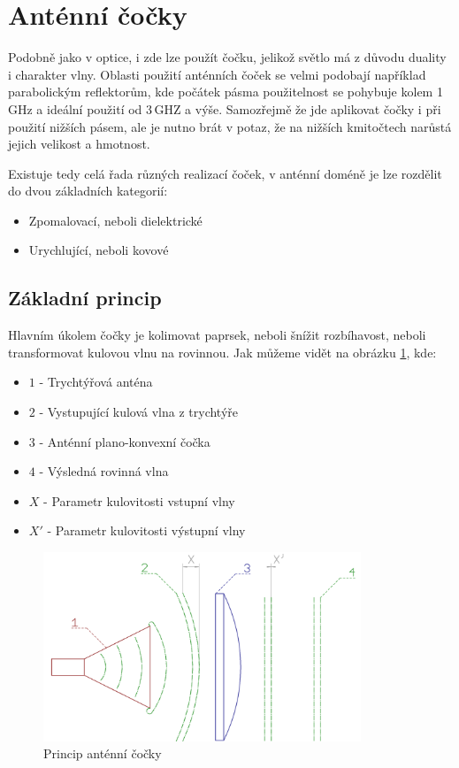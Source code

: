 \newpage
\section{Anténní čočky}
Podobně jako v optice, i zde lze použít čočku, jelikož světlo má z důvodu duality i charakter vlny.
Oblasti použití anténních čoček se velmi podobají například parabolickým reflektorům, kde počátek pásma použitelnost se pohybuje kolem 1\,GHz a ideální použití od 3\,GHZ a výše. Samozřejmě že jde aplikovat čočky i při použití nižších pásem, ale je nutno brát v potaz, že na nižších kmitočtech narůstá jejich velikost a hmotnost. 

Existuje tedy celá řada různých realizací čoček, v anténní doméně je lze rozdělit do dvou základních kategorií:
\begin{itemize}
\item Zpomalovací, neboli dielektrické
\item Urychlující, neboli kovové
\end{itemize}

\subsection{Základní princip}
Hlavním úkolem čočky je kolimovat paprsek, neboli šnížit rozbíhavost, neboli transformovat kulovou vlnu na rovinnou. Jak můžeme vidět na obrázku \ref{fig:hornLens}, kde:
\begin{itemize}
\item $1$ - Trychtýřová anténa
\item $2$ - Vystupující kulová vlna z trychtýře
\item $3$ - Anténní plano-konvexní čočka
\item $4$ - Výsledná rovinná vlna
\item $X$ - Parametr kulovitosti vstupní vlny
\item $X'$ - Parametr kulovitosti výstupní vlny
\end{itemize}
\begin{figure}[h]
\begin{center}
\includegraphics[width=9.5cm]{pics/lens}
\caption{Princip anténní čočky}
\label{fig:hornLens}
\end{center}
\end{figure}

